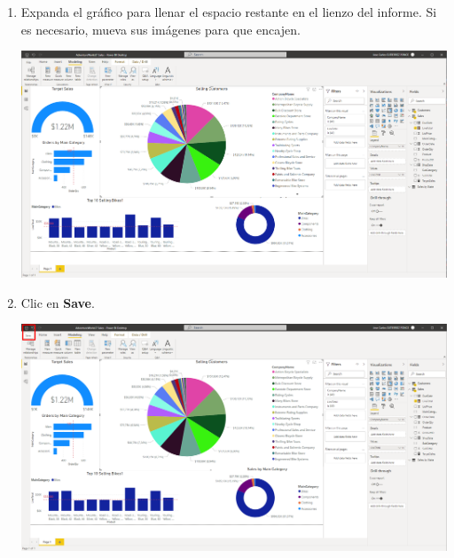 \documentclass[12pt,letterpaper]{article}
\newcommand\tab[1][1cm]{\hspace*{#1}}
\begin{document}
\begin{enumerate}[\tab 1.]
\begin{center}
        \end{center}
        \item Expanda el gráfico para llenar el espacio restante en el lienzo del informe. Si es necesario, mueva sus imágenes para que encajen.
        \begin{center}
            \includegraphics[width=13cm]{./img/img117.png}
        \end{center}
        \item Clic en \textbf{Save}.
        \begin{center}
            \includegraphics[width=13cm]{./img/img118.png}
        \end{center}
    \end{enumerate}
\end{document}
